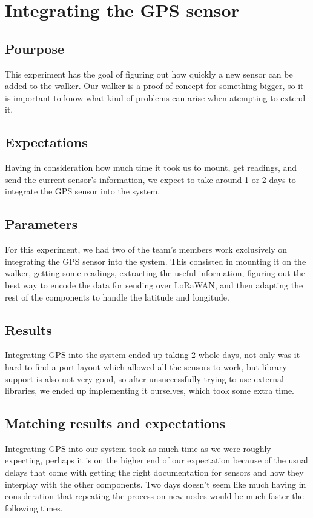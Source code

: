 \section{Integrating the GPS sensor}
	\subsection*{Pourpose}
	This experiment has the goal of figuring out how quickly a new sensor can be added to the walker. Our walker is a proof of concept for something bigger, so it is important to know what kind of problems can arise when atempting to extend it.

	\subsection*{Expectations}
	Having in consideration how much time it took us to mount, get readings, and send the current sensor's information, we expect to take around 1 or 2 days to integrate the GPS sensor into the system. 

	\subsection*{Parameters}
	For this experiment, we had two of the team's members work exclusively on integrating the GPS sensor into the system. This consisted in mounting it on the walker, getting some readings, extracting the useful information, figuring out the best way to encode the data for sending over LoRaWAN, and then adapting the rest of the components to handle the latitude and longitude.

	\subsection*{Results}
	Integrating GPS into the system ended up taking 2 whole days, not only was it hard to find a port layout which allowed all the sensors to work, but library support is also not very good, so after unsuccessfully trying to use external libraries, we ended up implementing it ourselves, which took some extra time.

	\subsection*{Matching results and expectations}
	Integrating GPS into our system took as much time as we were roughly expecting, perhaps it is on the higher end of our expectation because of the usual delays that come with getting the right documentation for sensors and how they interplay with the other components. Two days doesn't seem like much having in consideration that repeating the process on new nodes would be much faster the following times.

